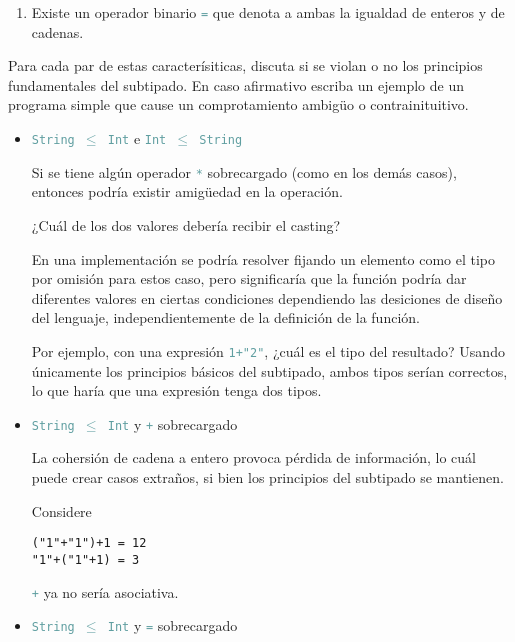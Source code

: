 \documentclass{article}
\newcommand{\tp}[1]{\textcolor{CadetBlue} {\texttt{#1}}}
\begin{document}
\begin{enumerate}
\begin{enumerate}
            \item Existe un operador binario \tp{=} que denota a ambas la
            igualdad de enteros y de cadenas.
        \end{enumerate}

        Para cada par de estas caracterísiticas, discuta si se violan o no los
        principios fundamentales del subtipado. En caso afirmativo escriba un
        ejemplo de un programa simple que cause un comprotamiento ambigüo o
        contrainituitivo.

        \begin{itemize}
            \item \tp{String $\leq$ Int} e \tp{Int $\leq$ String}

            Si se tiene algún operador \tp{*} sobrecargado (como en los demás
            casos), entonces podría existir amigüedad en la operación.

            ¿Cuál de los dos valores debería recibir el casting?

            En una implementación se podría resolver fijando un elemento como el
            tipo por omisión para estos caso, pero significaría que la función
            podría dar diferentes valores en ciertas condiciones dependiendo las
            desiciones de diseño del lenguaje, independientemente de la
            definición de la función.

            Por ejemplo, con una expresión \tp{1+"2"}, ¿cuál es el tipo del
            resultado? Usando únicamente los principios básicos del subtipado, 
            ambos tipos serían correctos, lo que haría que una expresión tenga 
            dos tipos.

            \item \tp{String $\leq$ Int} y \tp{+} sobrecargado

            La cohersión de cadena a entero provoca pérdida de información, lo 
            cuál puede crear casos extraños, si bien los principios del 
            subtipado se mantienen.

            Considere

            \begin{verbatim}
("1"+"1")+1 = 12
"1"+("1"+1) = 3
            \end{verbatim}

            \tp{+} ya no sería asociativa.

            \item \tp{String $\leq$ Int} y \tp{=} sobrecargado


\end{itemize}
\end{enumerate}
\end{document}
